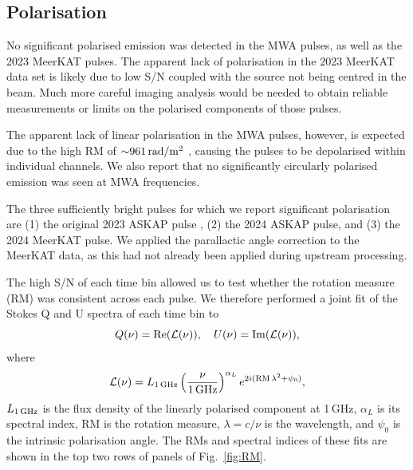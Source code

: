 \documentclass[fleqn,usenatbib]{mnras}
\newcommand{\Fig}{Fig.}
\begin{document}

\subsection{Polarisation} \label{sec:polarisation}

No significant polarised emission was detected in the MWA pulses, as well as the 2023 MeerKAT pulses.
The apparent lack of polarisation in the 2023 MeerKAT data set is likely due to low S/N coupled with the source not being centred in the beam.
Much more careful imaging analysis would be needed to obtain reliable measurements or limits on the polarised components of those pulses.

The apparent lack of linear polarisation in the MWA pulses, however, is expected due to the high RM of ${\sim}961\,{\rm rad}/{\rm m}^2$ , causing the pulses to be depolarised within individual channels.
We also report that no significantly circularly polarised emission was seen at MWA frequencies.

The three sufficiently bright pulses for which we report significant polarisation are (1) the original 2023 ASKAP pulse , (2) the 2024 ASKAP pulse, and (3) the 2024 MeerKAT pulse.
We applied the parallactic angle correction to the MeerKAT data, as this had not already been applied during upstream processing.

The high S/N of each time bin allowed us to test whether the rotation measure (RM) was consistent across each pulse.
We therefore performed a joint fit of the Stokes Q and U spectra of each time bin to
\begin{equation}
    Q(\nu) = {\rm Re}(\mathcal{L}(\nu)),
    \quad
    U(\nu) = {\rm Im}(\mathcal{L}(\nu)),
    \label{eqn:RM}
\end{equation}
where
\begin{equation}
    \mathcal{L}(\nu)
        = L_{\rm 1\,GHz}\left(\frac{\nu}{\rm 1\,GHz}\right)^{\alpha_L} e^{2i({\rm RM}\,\lambda^2 + \psi_0)},
\end{equation}
$L_{\rm 1\,GHz}$ is the flux density of the linearly polarised component at 1\,GHz, $\alpha_L$ is its spectral index, RM is the rotation measure, $\lambda = c/\nu$ is the wavelength, and $\psi_0$ is the intrinsic polarisation angle.
The RMs and spectral indices of these fits are shown in the top two rows of panels of \Fig~\ref{fig:RM}.
\end{document}
